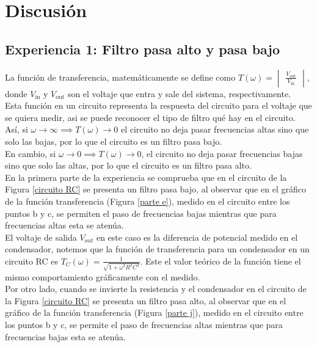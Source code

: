 \documentclass[letterpaper,11pt]{article} %
\begin{document}
\newpage
\section{Discusión}
\subsection{Experiencia 1: Filtro pasa alto y pasa bajo}
La función de transferencia, matemáticamente se define como $T(\omega)=\begin{vmatrix}
 \frac{V_{\mathrm{out}}}{V_{\mathrm{in}}}
\end{vmatrix}  $, donde $V_{\mathrm{in}}$ y $V_{\mathrm{out}}$ son el voltaje que entra y sale del sistema, respectivamente. \\

Esta función en un circuito representa la respuesta del circuito para el voltaje que se quiera medir, asi se puede reconocer el tipo de filtro qué hay en el circuito. Así, si $\omega \rightarrow \infty \implies T(\omega) \rightarrow 0$ el circuito no deja pasar frecuencias altas sino que solo las bajas, por lo que el circuito es un filtro pasa bajo. \\

En cambio, si $\omega \rightarrow 0 \implies T(\omega) \rightarrow 0$, el circuito no deja pasar frecuencias bajas sino que solo las altas, por lo que el circuito es un filtro pasa alto.
  \\
 
 En la primera parte de la experiencia se comprueba que en el circuito de la Figura \ref{circuito RC} se presenta un filtro pasa bajo, al observar que en el gráfico de la función transferencia (Figura \ref{parte e}), medido en el circuito entre los puntos b y c, se permiten el paso de frecuencias bajas mientras que para frecuencias altas esta se atenúa. \\
 
 El voltaje de salida $V_{out}$ en este caso es la diferencia de potencial medido en el condensador, notemos que la función de transferencia para un condensador en un circuito RC es $T_C(\omega)=\frac{1}{\sqrt{1+\omega^2R^2C^2}}$. Este el valor teórico de la función tiene el mismo comportamiento gráficamente con el medido.\\
 
 Por otro lado, cuando se invierte la resistencia y el condensador en el circuito de la Figura \ref{circuito RC} se presenta un filtro pasa alto, al observar que en el gráfico de la función transferencia (Figura \ref{parte j}), medido en el circuito entre los puntos b y c, se permite el paso de frecuencias altas mientras que para frecuencias bajas esta se atenúa. \\
 
\end{document}
